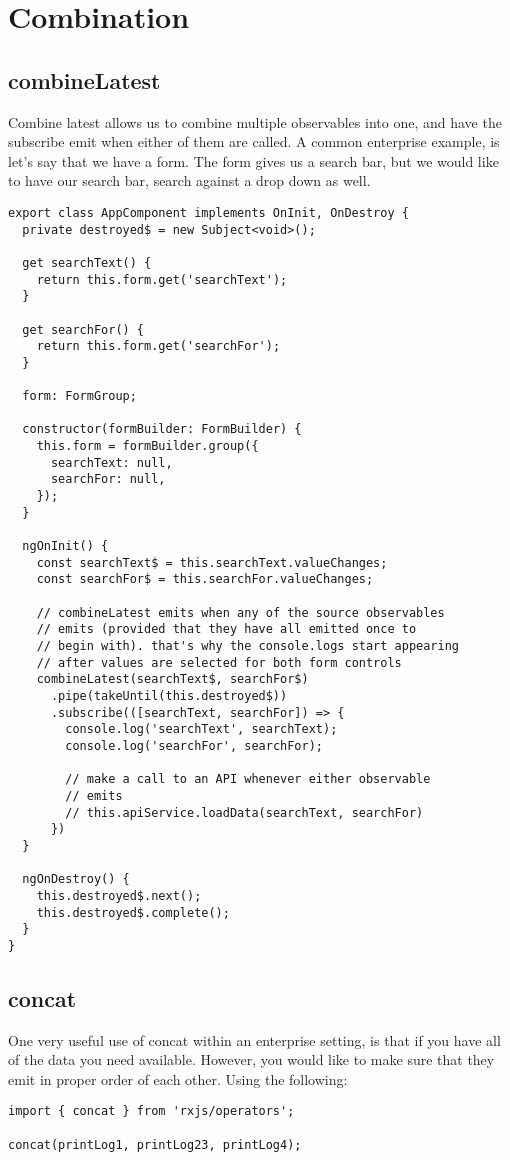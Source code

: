 \chapter{Combination}

\section{combineLatest}
Combine latest allows us to combine multiple observables into one, and have 
the subscribe emit when either of them are called. A common enterprise 
example, is let's say that we have a form. The form gives us a search bar,
but we would like to have our search bar, search against a drop down as well. 

\begin{lstlisting}[caption=search-form.component.ts]
export class AppComponent implements OnInit, OnDestroy {
  private destroyed$ = new Subject<void>();

  get searchText() {
    return this.form.get('searchText');
  }

  get searchFor() {
    return this.form.get('searchFor');
  }

  form: FormGroup;

  constructor(formBuilder: FormBuilder) {
    this.form = formBuilder.group({
      searchText: null,
      searchFor: null,
    });
  }

  ngOnInit() {
    const searchText$ = this.searchText.valueChanges;
    const searchFor$ = this.searchFor.valueChanges;

    // combineLatest emits when any of the source observables
    // emits (provided that they have all emitted once to
    // begin with). that's why the console.logs start appearing
    // after values are selected for both form controls
    combineLatest(searchText$, searchFor$)
      .pipe(takeUntil(this.destroyed$))
      .subscribe(([searchText, searchFor]) => {
        console.log('searchText', searchText);
        console.log('searchFor', searchFor);

        // make a call to an API whenever either observable
        // emits
        // this.apiService.loadData(searchText, searchFor)
      })
  }

  ngOnDestroy() {
    this.destroyed$.next();
    this.destroyed$.complete();
  }
} 
\end{lstlisting}

\section{concat}
One very useful use of concat within an enterprise setting, is that if you 
have all of the data you need available. However, you would like to make 
sure that they emit in proper order of each other. Using the following: 
\begin{lstlisting}[caption=concat-example.ts]
import { concat } from 'rxjs/operators';

concat(printLog1, printLog23, printLog4); 
\end{lstlisting}

